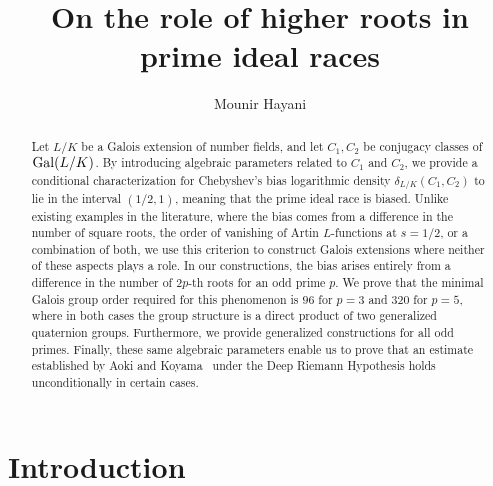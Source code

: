 \documentclass[12pt]{amsart}
\numberwithin{equation}{section}
\newcommand{\Gal}{{\rm Gal}}
\theoremstyle{definition}
\theoremstyle{remark}
\begin{document}
\title{On the role of higher roots in prime ideal races}
\author{Mounir Hayani}
\address{Max Planck Institute For Mathematics, Vivatsgasse 7, 53111, Bonn, Germany}
\date{}




\begin{abstract}
Let $L/K$ be a Galois extension of number fields, and let $C_1, C_2$ be conjugacy classes of $\Gal(L/K)$. By introducing algebraic parameters related to $C_1$ and $C_2$, we provide a conditional characterization for Chebyshev's bias logarithmic density $\delta_{L/K}(C_1,C_2)$ to lie in the interval $(1/2, 1)$, meaning that the prime ideal race is biased. Unlike existing examples in the literature, where the bias comes from a difference in the number of square roots, the order of vanishing of Artin $L$-functions at $s=1/2$, or a combination of both, we use this criterion to construct Galois extensions where neither of these aspects plays a role. In our constructions, the bias arises entirely from a difference in the number of $2p$-th roots for an odd prime $p$. We prove that the minimal Galois group order required for this phenomenon is $96$ for $p=3$ and $320$ for $p=5$, where in both cases the group structure is a direct product of two generalized quaternion groups. Furthermore, we provide generalized constructions for all odd primes. Finally, these same algebraic parameters enable us to prove that an estimate established by Aoki and Koyama~\cite{Ao-Ko} under the Deep Riemann Hypothesis holds unconditionally in certain cases.
\end{abstract}


\maketitle

\tableofcontents



\section{Introduction}
\end{document}
